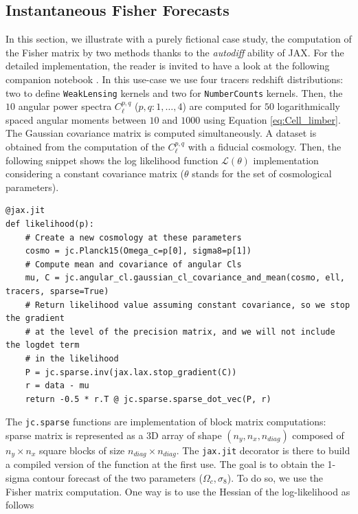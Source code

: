 \documentclass[twocolumn,twocolappendix,nofootinbib,iop]{openjournal}
\newcommand{\nblink}[1]{\href{https://github.com/DifferentiableUniverseInitiative/jax-cosmo-paper/blob/master/notebooks/#1.ipynb}{\faFileCodeO}}
\begin{document}
\subsection{Instantaneous Fisher Forecasts}
In this section, we illustrate with a purely fictional case study, the computation of the Fisher matrix \citep{1997ApJ...480...22T,Stuart1991} by two methods thanks to the \textit{autodiff} ability of JAX. For the detailed implementation, the reader is invited to have a look at the following companion notebook \nblink{Simple-Fisher}. In this use-case we use four tracers redshift distributions: two to define \texttt{WeakLensing} kernels and two for \texttt{NumberCounts} kernels. Then, the $10$ angular power spectra $C_\ell^{p,q}$ ($p,q:1,\dots,4$) are computed for $50$  logarithmically spaced angular moments between $10$ and $1000$ using Equation \ref{eq:Cell_limber}. The Gaussian covariance matrix is computed simultaneously. A dataset is obtained from the computation of the $C_\ell^{p,q}$ with a fiducial cosmology. Then, the following snippet shows the log likelihood function $\mathcal{L}(\theta)$ implementation considering a constant covariance matrix ($\theta$ stands for the set of cosmological parameters). 
\begin{lstlisting}[language=iPython]
@jax.jit
def likelihood(p):
    # Create a new cosmology at these parameters
    cosmo = jc.Planck15(Omega_c=p[0], sigma8=p[1])
    # Compute mean and covariance of angular Cls
    mu, C = jc.angular_cl.gaussian_cl_covariance_and_mean(cosmo, ell, tracers, sparse=True)
    # Return likelihood value assuming constant covariance, so we stop the gradient
    # at the level of the precision matrix, and we will not include the logdet term
    # in the likelihood
    P = jc.sparse.inv(jax.lax.stop_gradient(C))
    r = data - mu
    return -0.5 * r.T @ jc.sparse.sparse_dot_vec(P, r)
\end{lstlisting}
The \texttt{jc.sparse} functions are implementation of block matrix computations: sparse matrix is represented as a 3D array of shape $(n_y, n_x, n_{diag})$ composed of $n_y \times n_x$ square blocks of size $n_{diag} \times n_{diag}$.  The \texttt{jax.jit} decorator is there to build a compiled version of the function at the first use. The goal is to obtain the 1-sigma contour forecast of the two parameters ($\Omega_c, \sigma_8$). To do so, we use the Fisher matrix computation. One way is to use the Hessian of the log-likelihood as follows
\end{document}
